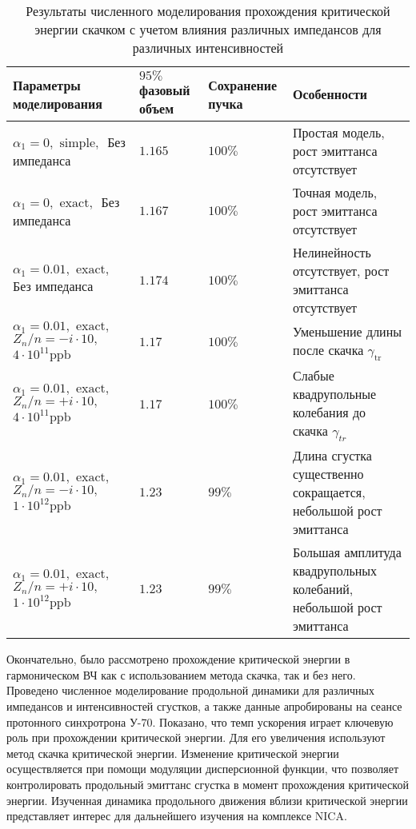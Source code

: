 \begin{table}
\begin{center}
\begin{tabular}{| m{4cm} | M{2.5cm} | M{2.5cm} | m{6.6cm} |}
\hline 
Параметры моделирования & $95 \%$ фазовый объем & Сохранение пучка & Особенности \\
\hline
$ \alpha_1=0, \text { simple, } $ Без импеданса
 & $1.165$ & $100\%$ &
Простая модель, рост эмиттанса отсутствует \\
\hline
$ \alpha_1=0, \text { exact, } $ Без импеданса
 & $1.167$ & $100\%$ & 
Точная модель, рост эмиттанса отсутствует  \\
\hline
$ \alpha_1=0.01, \text { exact, }$ Без импеданса
 & $1.174$ & $100\%$ & Нелинейность отсутствует, рост эмиттанса отсутствует \\
\hline 
$ \alpha_1=0.01, \text { exact, } $
$ Z_n / n=-i \cdot 10, \quad $
$ 4 \cdot 10^{11} \mathrm{ppb} $
 & $1.17$ & $100\%$ & Уменьшение длины после скачка $\gamma_{\text {tr }}$ \\
\hline 
$ \alpha_1=0.01, \text { exact, } $
$ Z_n / n=+i \cdot 10, \quad $
$ 4 \cdot 10^{11} \mathrm{ppb} $
 & $1.17$ & $100\%$ & Слабые квадрупольные колебания до скачка $\gamma_{t r}$ \\
\hline
$ \alpha_1=0.01, \text { exact, } $
$ Z_n / n=-i \cdot 10, \quad$
$ 1 \cdot 10^{12} \mathrm{ppb} $
 & $1.23$ & $99\%$ & Длина сгустка существенно сокращается, небольшой рост эмиттанса \\
\hline
$ \alpha_1=0.01, \text { exact, } $
$ Z_n / n=+i \cdot 10, \quad$
$ 1 \cdot 10^{12} \mathrm{ppb} $
 & $1.23$ & $99\%$ & Большая амплитуда квадрупольных колебаний, небольшой рост эмиттанса \\
\hline
\end{tabular}
\end{center}
\caption{Результаты численного моделирования прохождения критической энергии скачком с учетом влияния различных импедансов для различных интенсивностей}
\end{table}

\par Окончательно, было рассмотрено прохождение критической энергии в гармоническом ВЧ как с использованием метода скачка, так и без него. Проведено численное моделирование продольной динамики для различных импедансов и интенсивностей сгустков, а также данные апробированы на сеансе протонного синхротрона У-70. Показано, что темп ускорения играет ключевую роль при прохождении критической энергии. Для его увеличения используют метод скачка критической энергии. Изменение критической энергии осуществляется при помощи модуляции дисперсионной функции, что позволяет контролировать продольный эмиттанс сгустка в момент прохождения критической энергии. Изученная динамика продольного движения вблизи критической энергии представляет интерес для дальнейшего изучения на комплексе NICA.

